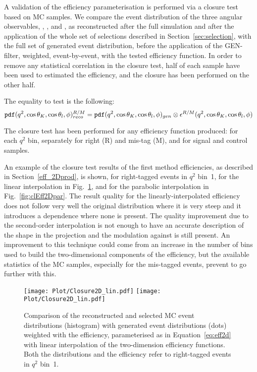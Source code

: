 A validation of the efficiency parameterisation is performed via a closure test based on MC samples.
We compare the event distribution of the three angular observables, \cTK, \cTL, and \PHI, as reconstructed after the full simulation and after the application of the whole set of selections described in Section~\ref{sec:selection}, with the full set of generated event distribution, before the application of the GEN-filter, weighted, event-by-event, with the tested efficiency function.
In order to remove any statistical correlation in the closure test, half of each sample have been used to estimated the efficiency, and the closure has been performed on the other half.

The equality to test is the following:
\begin{equation}\label{eq:effClosure}
    \mathtt{pdf}(q^2,\cos\theta_K,\cos\theta_l,\phi)_{reco}^{R/M}=\mathtt{pdf}(q^2,\cos\theta_K,\cos\theta_l,\phi)_{gen}\otimes\epsilon^{R/M}(q^2,\cos\theta_K,\cos\theta_l,\phi)
\end{equation}

The closure test has been performed for any efficiency function produced: for each $q^2$ bin, separately for right (R) and mis-tag (M), and for signal and control samples.

An example of the closure test results of the first method efficiencies, as described in Section~\ref{eff_2Dprod}, is shown, for right-tagged events in $q^2$ bin~1, for the linear interpolation in Fig.~\ref{fig:clEff2Dlin}, and for the parabolic interpolation in Fig.~\ref{fig:clEff2Dpar}.
The result quality for the linearly-interpolated efficiency does not follow very well the original distribution where it is very steep and it introduces a \PHI dependence where none is present.
The quality improvement due to the second-order interpolation is not enough to have an accurate description of the shape in the \cTK projection and the modulation against \PHI is still present.
An improvement to this technique could come from an increase in the number of bins used to build the two-dimensional components of the efficiency, but the available statistics of the MC samples, especially for the mis-tagged events, prevent to go further with this.

\begin{figure}[hbt]
    \texttt{[image: Plot/Closure2D\_lin.pdf]}
    \texttt{[image: Plot/Closure2D\_lin.pdf]}
    \caption{Comparison of the reconstructed and selected MC event distributions (histogram) with generated event distributions (dots) weighted with the efficiency, parameterised as in Equation~\ref{eq:eff2d} with linear interpolation of the two-dimension efficiency functions. Both the distributions and the efficiency refer to right-tagged events in $q^2$ bin~1.}
    \label{fig:clEff2Dlin}
\end{figure}

